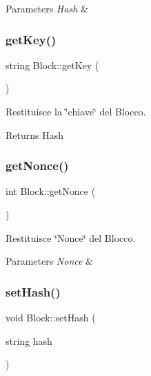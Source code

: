\begin{DoxyParams}{Parameters}
{\em Hash} & \\
\hline
\end{DoxyParams}
\mbox{\label{class_block_ab2a9d794f7f9ee273c5dafe349dfc8ef}} 
\subsubsection{\texorpdfstring{get\+Key()}{getKey()}}
{\footnotesize\ttfamily string Block\+::get\+Key (\begin{DoxyParamCaption}{ }\end{DoxyParamCaption})\hspace{0.3cm}{\ttfamily [virtual]}}



Restituisce la \char`\"{}chiave\char`\"{} del Blocco. 

\begin{DoxyReturn}{Returns}
Hash 
\end{DoxyReturn}
\mbox{\label{class_block_a3852419958b657cf9e119fb537d01609}} 
\subsubsection{\texorpdfstring{get\+Nonce()}{getNonce()}}
{\footnotesize\ttfamily int Block\+::get\+Nonce (\begin{DoxyParamCaption}{ }\end{DoxyParamCaption})\hspace{0.3cm}{\ttfamily [virtual]}}



Restituisce \char`\"{}\+Nonce\char`\"{} del Blocco. 


\begin{DoxyParams}{Parameters}
{\em Nonce} & \\
\hline
\end{DoxyParams}
\mbox{\label{class_block_a156d082db99981b4710e00bec0ce7a59}} 
\subsubsection{\texorpdfstring{set\+Hash()}{setHash()}}
{\footnotesize\ttfamily void Block\+::set\+Hash (\begin{DoxyParamCaption}\item[{string}]{hash }\end{DoxyParamCaption})\hspace{0.3cm}{\ttfamily [virtual]}}



